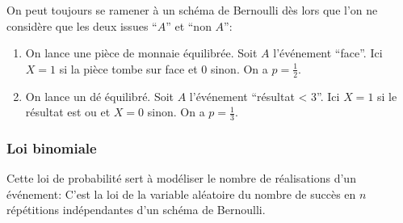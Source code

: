 \begin{exemple} On peut toujours se ramener à un schéma de Bernoulli dès lors que l'on ne considère que les deux issues ``$A$'' et ``non $A$'': 
	\begin{enumerate}
		\item On lance une pièce de monnaie équilibrée. Soit $A$ l'événement ``face''. Ici $X= 1$ si la pièce tombe sur face et $0$ sinon. On a $ p =\frac{1}{2}$.
		\item On lance un dé équilibré. Soit $A$ l'événement ``résultat < 3''. Ici $X = 1$ si le résultat est  ou  et $X=0$ sinon. On a $p = \frac{1}{3}$.
	\end{enumerate}
\end{exemple} 

\sld{\vfill\pagebreak[5]}%


\subsubsection{Loi binomiale}

Cette loi de probabilité sert à modéliser le nombre de réalisations d'un événement: %
	C'est la loi de la variable aléatoire du nombre de succès en $n$ répétitions indépendantes d'un schéma de Bernoulli. 
	
